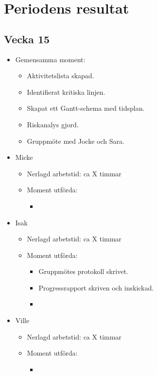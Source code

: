 \section{Periodens resultat}
\subsection*{Vecka 15}

\begin{itemize}[noitemsep]
    \item Gemensamma moment:
    \begin{itemize}[noitemsep]
        \item Aktivitetslista skapad.
        \item Identifierat kritiska linjen.
        \item Skapat ett Gantt-schema med tidsplan.
        \item Riskanalys gjord.
        \item Gruppmöte med Jocke och Sara.
    \end{itemize}
    \item Micke
    \begin{itemize}[noitemsep]
        \item Nerlagd arbetstid: ca X timmar
        \item Moment utförda:
        \begin{itemize}[noitemsep]
            \item 
		\end{itemize}           
    \end{itemize}
    \item Isak
    \begin{itemize}[noitemsep]
        \item Nerlagd arbetstid: ca X timmar
        \item Moment utförda:
        \begin{itemize}[noitemsep]
            \item Gruppmötes protokoll skrivet.
            \item Progressrapport skriven och inskickad.
            \item 
        \end{itemize}
    \end{itemize}
    \item Ville
    \begin{itemize}[noitemsep]
        \item Nerlagd arbetstid: ca X timmar
        \item Moment utförda:
        \begin{itemize}[noitemsep]
            \item 
        \end{itemize}
    \end{itemize}
\end{itemize}

